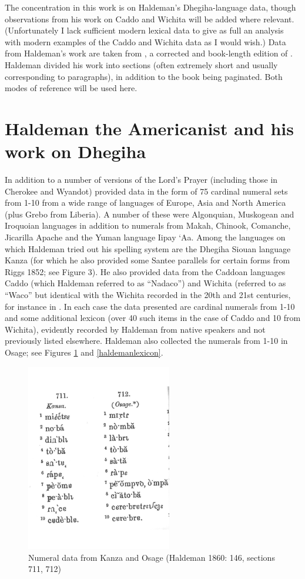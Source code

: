 \documentclass[output=paper]{LSP/langsci}
\begin{document}
The concentration in this work is on Haldeman's Dhegiha-language data, though observations from his work on Caddo and Wichita will be added where relevant. (Unfortunately I lack sufficient modern lexical data to give as full an analysis with modern examples of the Caddo and Wichita data as I would wish.)   Data from Haldeman's work are taken from \citet{Haldeman1860}, a corrected and book-length edition of \citet{Haldeman1859}.  Haldeman divided his work into sections (often extremely short and usually corresponding to paragraphs), in addition to the book being paginated.  Both modes of reference will be used here.  

\section{Haldeman the Americanist and his work on Dhegiha}  

In addition to a number of versions of the Lord's Prayer (including those in Cherokee and Wyandot) \citet{Haldeman1860}  provided data in the form of 75 cardinal numeral sets from 1-10 from a wide range of languages of Europe, Asia and North America (plus Grebo from Liberia).  A number of these were Algonquian, Muskogean and Iroquoian languages in addition to numerals from Makah, Chinook, Comanche, Jicarilla Apache and the Yuman language Iipay `Aa. Among the languages on which Haldeman tried out his spelling system are the Dhegiha Siouan language Kanza (for which he also provided some Santee parallels for certain forms from Riggs 1852; see Figure 3).  He also provided data from the Caddoan languages Caddo (which Haldeman referred to as ``Nadaco'') and Wichita (referred to as ``Waco'' but identical with the Wichita recorded in the 20th and 21st centuries, for instance in \citet{Rood1975}. In each case the data presented are cardinal numerals from 1-10 and some additional lexicon (over 40 such items in the case of Caddo and 10 from Wichita), evidently recorded by Haldeman from native speakers and not previously listed elsewhere. Haldeman also collected the numerals from 1-10 in Osage; see Figures \ref{haldemannumerals} and \ref{haldemanlexicon}.   

\begin{figure}
\centering
\caption{Numeral data from Kanza and Osage (Haldeman 1860: 146, sections 711, 712)} \label{haldemannumerals}
\includegraphics[width=2.5in]{figures/GrantNumerals}
\end{figure}
\end{document}
